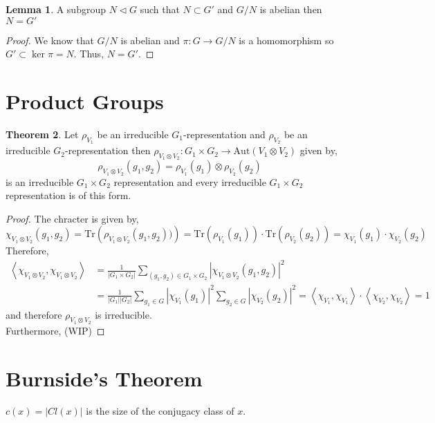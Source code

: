 \documentclass[12pt]{extarticle}
\newcommand{\tr}[1]{\mathrm{Tr} \! \left(#1\right)}
\newcommand{\aut}[1]{\mathrm{Aut}\left( #1 \right)}
\newcommand{\inner}[2]{\left<#1, #2 \right>}
\theoremstyle{definition}
\newtheorem{theorem}{Theorem}[section]
\newtheorem{lemma}[theorem]{Lemma}
\newenvironment{definition}[1][Definition:]{\begin{trivlist}
\item[\hskip \labelsep {\bfseries #1}]}{\end{trivlist}}
\begin{document}
\begin{lemma}
A subgroup $N \triangleleft G$ such that $N \subset G'$ and $G / N$ is abelian then $N = G'$
\end{lemma}

\begin{proof}
We know that $G/N$ is abelian and $\pi : G \to G/N$ is a homomorphism so $G' \subset \ker{\pi} = N$. Thus, $N = G'$. 
\end{proof}

\section{Product Groups}

\begin{theorem}
Let $\rho_{V_1}$ be an irreducible $G_1$-representation and $\rho_{V_2}$ be an irreducible $G_2$-representation then $\rho_{V_1 \otimes V_2} : G_1 \times G_2 \to \aut{V_1 \otimes V_2}$ given by,
 \[\rho_{V_1 \otimes V_2}(g_1, g_2) = \rho_{V_1}(g_1) \otimes \rho_{V_2}(g_2) \]
is an irreducible $G_1 \times G_2$ representation and every irreducible $G_1 \times G_2$ representation is of this form.
\end{theorem}

\begin{proof}
The chracter is given by, 
\[\chi_{V_1 \otimes V_2}(g_1, g_2) = \tr{\rho_{V_1 \otimes V_2}(g_1, g_2))} = \tr{\rho_{V_1}(g_1)} \cdot \tr{\rho_{V_2}(g_2)} = \chi_{V_1}(g_1) \cdot \chi_{V_2}(g_2)\]
Therefore,
\begin{align*}
\inner{\chi_{V_1 \otimes V_2}}{\chi_{V_1 \otimes V_2}} & = \frac{1}{|G_1 \times G_2|} \sum_{(g_1, g_2) \in G_1 \times G_2} | \chi_{V_1 \otimes V_2}(g_1, g_2) |^2 
\\
& = \frac{1}{|G_1||G_2|} \sum_{g_1 \in G} |\chi_{V_1}(g_1)|^2 \sum_{g_2 \in G} |\chi_{V_2} (g_2) |^2 = \inner{\chi_{V_1}}{\chi_{V_1}} \cdot \inner{\chi_{V_2}}{\chi_{V_2}} = 1
\end{align*}
and therefore $\rho_{V_1 \otimes V_2}$ is irreducible. \bigskip\\
Furthermore, (WIP)
\end{proof}

\section{Burnside's Theorem}

\begin{definition}
$c(x) = |Cl(x)|$ is the size of the conjugacy class of $x$.
\end{definition}
\end{document}

